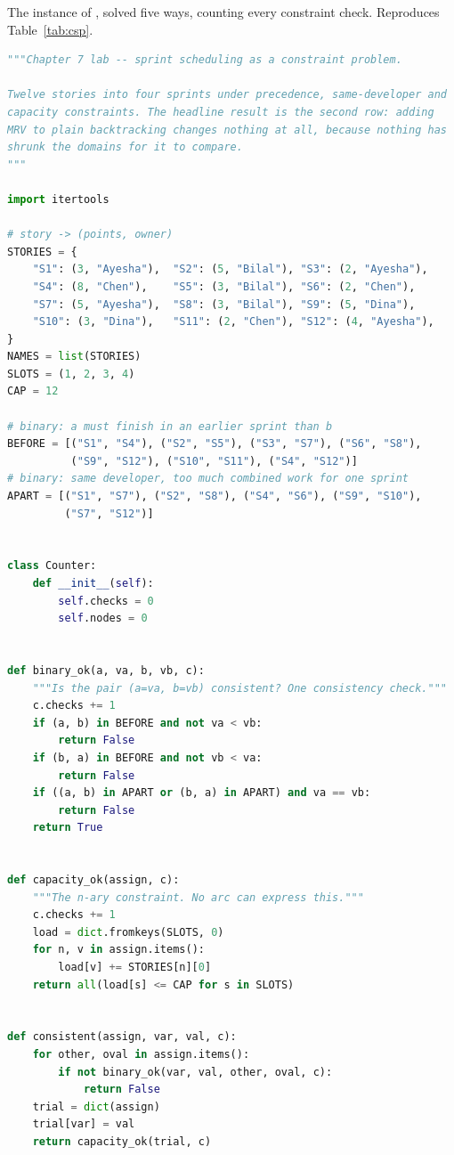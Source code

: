 \begin{lab}
The instance of , solved five ways, counting every constraint
check. Reproduces Table~\ref{tab:csp}.
\begin{lstlisting}[language=Python]
"""Chapter 7 lab -- sprint scheduling as a constraint problem.

Twelve stories into four sprints under precedence, same-developer and
capacity constraints. The headline result is the second row: adding
MRV to plain backtracking changes nothing at all, because nothing has
shrunk the domains for it to compare.
"""

import itertools

# story -> (points, owner)
STORIES = {
    "S1": (3, "Ayesha"),  "S2": (5, "Bilal"), "S3": (2, "Ayesha"),
    "S4": (8, "Chen"),    "S5": (3, "Bilal"), "S6": (2, "Chen"),
    "S7": (5, "Ayesha"),  "S8": (3, "Bilal"), "S9": (5, "Dina"),
    "S10": (3, "Dina"),   "S11": (2, "Chen"), "S12": (4, "Ayesha"),
}
NAMES = list(STORIES)
SLOTS = (1, 2, 3, 4)
CAP = 12

# binary: a must finish in an earlier sprint than b
BEFORE = [("S1", "S4"), ("S2", "S5"), ("S3", "S7"), ("S6", "S8"),
          ("S9", "S12"), ("S10", "S11"), ("S4", "S12")]
# binary: same developer, too much combined work for one sprint
APART = [("S1", "S7"), ("S2", "S8"), ("S4", "S6"), ("S9", "S10"),
         ("S7", "S12")]


class Counter:
    def __init__(self):
        self.checks = 0
        self.nodes = 0


def binary_ok(a, va, b, vb, c):
    """Is the pair (a=va, b=vb) consistent? One consistency check."""
    c.checks += 1
    if (a, b) in BEFORE and not va < vb:
        return False
    if (b, a) in BEFORE and not vb < va:
        return False
    if ((a, b) in APART or (b, a) in APART) and va == vb:
        return False
    return True


def capacity_ok(assign, c):
    """The n-ary constraint. No arc can express this."""
    c.checks += 1
    load = dict.fromkeys(SLOTS, 0)
    for n, v in assign.items():
        load[v] += STORIES[n][0]
    return all(load[s] <= CAP for s in SLOTS)


def consistent(assign, var, val, c):
    for other, oval in assign.items():
        if not binary_ok(var, val, other, oval, c):
            return False
    trial = dict(assign)
    trial[var] = val
    return capacity_ok(trial, c)



\end{lstlisting}
\end{lab}
